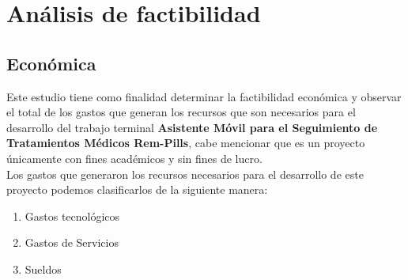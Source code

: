 %	
%
%	
%	
%	
%	
%	

\section{Análisis de factibilidad}
\subsection{Económica}

Este estudio tiene como finalidad determinar la factibilidad económica y observar el total de los gastos que generan los recursos que son necesarios para el desarrollo del trabajo terminal \textbf{ Asistente Móvil para el Seguimiento de Tratamientos Médicos Rem-Pills}, cabe mencionar que es un proyecto únicamente con fines académicos y sin fines de lucro.\\

Los gastos que generaron los recursos necesarios para el desarrollo de este proyecto podemos clasificarlos de la siguiente manera:

\begin{enumerate}
	\item Gastos tecnológicos
	\item Gastos de Servicios
	\item Sueldos
\end{enumerate}

